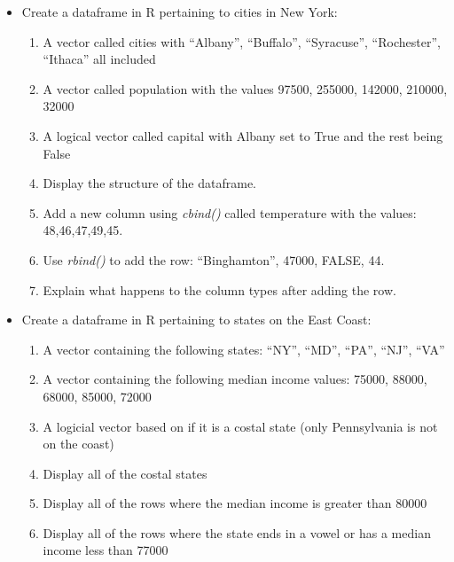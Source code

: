 \documentclass[
  letterpaper,
  DIV=11,
  numbers=noendperiod]{scrreprt}
\providecommand{\tightlist}{%
  \setlength{\itemsep}{0pt}\setlength{\parskip}{0pt}}
\begin{document}
\begin{itemize}
\tightlist
\item
  Create a dataframe in R pertaining to cities in New York:

  \begin{enumerate}
  \def\labelenumi{\alph{enumi})}
  \tightlist
  \item
    A vector called cities with ``Albany'', ``Buffalo'', ``Syracuse'',
    ``Rochester'', ``Ithaca'' all included\\
  \item
    A vector called population with the values 97500, 255000, 142000,
    210000, 32000
  \item
    A logical vector called capital with Albany set to True and the rest
    being False
  \item
    Display the structure of the dataframe.
  \item
    Add a new column using \emph{cbind()} called temperature with the
    values: 48,46,47,49,45.
  \item
    Use \emph{rbind()} to add the row: ``Binghamton'', 47000, FALSE, 44.
  \item
    Explain what happens to the column types after adding the row.
  \end{enumerate}
\item
  Create a dataframe in R pertaining to states on the East Coast:

  \begin{enumerate}
  \def\labelenumi{\alph{enumi})}
  \tightlist
  \item
    A vector containing the following states: ``NY'', ``MD'', ``PA'',
    ``NJ'', ``VA''
  \item
    A vector containing the following median income values: 75000,
    88000, 68000, 85000, 72000
  \item
    A logicial vector based on if it is a costal state (only
    Pennsylvania is not on the coast)
  \item
    Display all of the costal states
  \item
    Display all of the rows where the median income is greater than
    80000
  \item
    Display all of the rows where the state ends in a vowel or has a
    median income less than 77000
  \end{enumerate}
\end{itemize}

\end{document}
